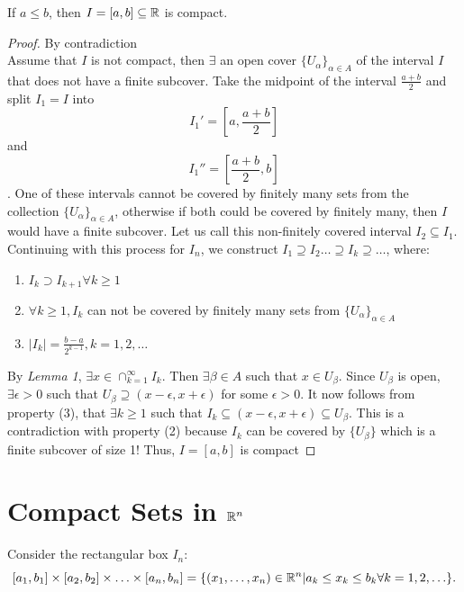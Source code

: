 \documentclass[a4paper]{article}
\begin{document}
\begin{theorem}
  If $a \leq b$, then  $I = [a,b] \subseteq \mathbb{R}$ is compact.

  \begin{proof}{By contradiction}\\
    Assume that $I$ is not compact, then  $\exists $ an open cover $\{ U_{\alpha}\}_{\alpha \in A}$ of the interval
    $I$ that does not have a finite subcover. Take the midpoint of the interval $\frac{a+b}{2}$ and split $I_1 = I$ into
    $$I_1' = [a,\frac{a+b}{2}]$$ and $$I_1'' = [\frac{a+b}{2}, b]$$. One of these intervals cannot be covered by
    finitely many sets from the collection $\{U_{\alpha}\}_{\alpha \in A}$, otherwise if both could be covered
    by finitely many, then $I$ would have a finite subcover. Let us call this non-finitely covered interval $I_2 \subseteq I_1$.
    Continuing with this process for $I_n$, we construct $I_1 \supseteq I_2 \ldots \supseteq I_k \supseteq \ldots$,
    where:
    \begin{enumerate}
      \item $I_k \supset I_{k+1} \forall k \geq 1$
      \item $\forall k \geq 1, I_k$ can not be covered by finitely many sets from  $\{U_{\alpha}\}_{\alpha \in A}$ 
      \item $\mid I_k\mid  = \frac{b-a}{2^{k-1}}, k = 1,2,\ldots$
    \end{enumerate}
    By \textit{Lemma 1}, $\exists x \in \cap_{k=1}^\infty I_k$. Then $\exists \beta \in A$ such that $x \in U_{\beta}$.
    Since $U_\beta$ is open,  $\exists \epsilon > 0$ such that  $U_{\beta} \supseteq \left( x - \epsilon, x + \epsilon \right)$ for
    some $\epsilon > 0$. It now follows from property (3), that $\exists k \geq 1$ such that $I_k \subseteq \left( x - \epsilon,
    x + \epsilon \right) \subseteq U_\beta$. This is a contradiction with property (2) because $I_k$ can be covered by  $\{U_\beta\}$ 
    which is a finite subcover of size 1! Thus, $I = [a,b]$ is compact
  \end{proof}
\end{theorem}

\section{Compact Sets in $\mathbb{R}^n$}
Consider the rectangular box $I_n$:
\[
  [a_1,b_1] \times [a_2, b_2] \times \ldots \times [a_n,b_n] = \{\left( x_1,\ldots,x_n \right) \in \mathbb{R}^n | 
  a_k \leq x_k \leq b_k \forall k = 1,2,\ldots\} 
.\] 
\end{document}
